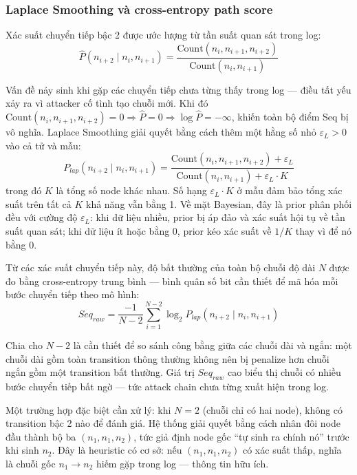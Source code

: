 \documentclass[../main.tex]{subfiles}
\begin{document}
\subsubsection{Laplace Smoothing và cross-entropy path score}
\label{subsubsection:2.4.4.2}

Xác suất chuyển tiếp bậc 2 được ước lượng từ tần suất quan sát trong log:
\begin{equation}
    \hat{P}(n_{i+2} \mid n_i, n_{i+1}) = \frac{\text{Count}(n_i, n_{i+1}, n_{i+2})}{\text{Count}(n_i, n_{i+1})} \tag{1.18}
\end{equation}

Vấn đề nảy sinh khi gặp các chuyển tiếp chưa từng thấy trong log — điều tất yếu xảy ra vì attacker cố tình tạo chuỗi mới. Khi đó $\text{Count}(n_i, n_{i+1}, n_{i+2}) = 0 \Rightarrow \hat{P} = 0 \Rightarrow \log \hat{P} = -\infty$, khiến toàn bộ điểm Seq bị vô nghĩa. Laplace Smoothing giải quyết bằng cách thêm một hằng số nhỏ $\varepsilon_L > 0$ vào cả tử và mẫu:
\begin{equation}
    P_{lap}(n_{i+2} \mid n_i, n_{i+1}) = \frac{\text{Count}(n_i, n_{i+1}, n_{i+2}) + \varepsilon_L}{\text{Count}(n_i, n_{i+1}) + \varepsilon_L \cdot K} \tag{1.19}
\end{equation}
trong đó $K$ là tổng số node khác nhau. Số hạng $\varepsilon_L \cdot K$ ở mẫu đảm bảo tổng xác suất trên tất cả $K$ khả năng vẫn bằng 1. Về mặt Bayesian, đây là prior phân phối đều với cường độ $\varepsilon_L$: khi dữ liệu nhiều, prior bị áp đảo và xác suất hội tụ về tần suất quan sát; khi dữ liệu ít hoặc bằng 0, prior kéo xác suất về $1/K$ thay vì để nó bằng 0.

Từ các xác suất chuyển tiếp này, độ bất thường của toàn bộ chuỗi độ dài $N$ được đo bằng cross-entropy trung bình — bình quân số bit cần thiết để mã hóa mỗi bước chuyển tiếp theo mô hình:
\begin{equation}
    Seq_{raw} = \frac{-1}{N-2} \sum_{i=1}^{N-2} \log_2 P_{lap}(n_{i+2} \mid n_i, n_{i+1}) \tag{1.20}
\end{equation}

Chia cho $N - 2$ là cần thiết để so sánh công bằng giữa các chuỗi dài và ngắn: một chuỗi dài gồm toàn transition thông thường không nên bị penalize hơn chuỗi ngắn gồm một transition bất thường. Giá trị $Seq_{raw}$ cao biểu thị chuỗi có nhiều bước chuyển tiếp bất ngờ — tức attack chain chưa từng xuất hiện trong log.

Một trường hợp đặc biệt cần xử lý: khi $N = 2$ (chuỗi chỉ có hai node), không có transition bậc 2 nào để đánh giá. Hệ thống giải quyết bằng cách nhân đôi node đầu thành bộ ba $(n_1, n_1, n_2)$, tức giả định node gốc ``tự sinh ra chính nó'' trước khi sinh $n_2$. Đây là heuristic có cơ sở: nếu $(n_1, n_1, n_2)$ có xác suất thấp, nghĩa là chuỗi gốc $n_1 \to n_2$ hiếm gặp trong log — thông tin hữu ích.
\end{document}
